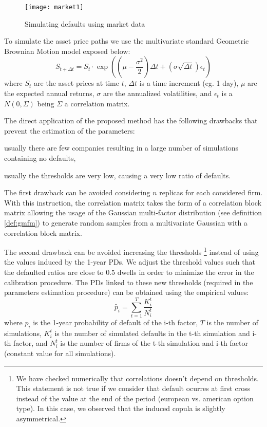 \documentclass[11pt,fleqn]{book} %
\begin{document}
\begin{figure}[!ht]
	\centering
	\texttt{[image: market1]}
	\caption{Simulating defaults using market data}
	\label{fig:market1}
\end{figure}

To simulate the asset price paths we use the multivariate standard Geometric 
Brownian Motion model exposed below:
\begin{displaymath}
	S_{t+\Delta t} = S_t \cdot \exp\left(
	\left(\mu - \frac{\sigma^2}{2}\right) \Delta t +
	\left(\sigma \sqrt{\Delta t}\right) \epsilon_t
	\right)
\end{displaymath}
where $S_t$ are the asset prices at time $t$, $\Delta t$ is a time increment
(eg. 1 day), $\mu$ are the expected annual returns, $\sigma$ are the annualized 
volatilities, and $\epsilon_t$ is a $N(0,\Sigma)$ being $\Sigma$ a correlation 
matrix.

The direct application of the proposed method has the following drawbacks
that prevent the estimation of the parameters:
\begin{inparaenum}[1)]
	\item usually there are few companies resulting in a large number of 
	simulations containing no defaults,
	\item usually the thresholds are very low, causing a very low ratio of 
	defaults.
\end{inparaenum}

The first drawback can be avoided considering $n$ replicas for each considered
firm. With this instruction, the correlation matrix takes the form of a 
correlation block matrix allowing the usage of the Gaussian multi-factor 
distribution (see definition \ref{def:gmfm}) to generate random samples from 
a multivariate Gaussian with a correlation block matrix.

The second drawback can be avoided increasing the thresholds \footnote{ We have 
checked numerically that correlations doesn't depend on thresholds. This 
statement is not true if we consider that default ocurres at first cross 
instead of the value at the end of the period (european vs. american option 
type). In this case, we observed that the induced copula is slightly 
asymmetrical.} instead of using the values induced by the 1-year PDs. We 
adjust the threshold values such that the defaulted ratios are close to $0.5$ 
dwells in order to minimize the error in the calibration procedure. The PDs 
linked to these new thresholds (required in the parameters estimation procedure) 
can be obtained using the empirical values:
\begin{displaymath}
	\tilde{p_i} = \sum_{t=1}^{T} \frac{K_i^t}{N_i^t}
\end{displaymath}
where $p_i$ is the 1-year probability of default of the i-th factor, $T$ is the
number of simulations, $K_i^t$ is the number of simulated defaults in the
t-th simulation and i-th factor, and $N_i^t$ is the number of firms of the t-th 
simulation and i-th factor (constant value for all simulations).
\end{document}
